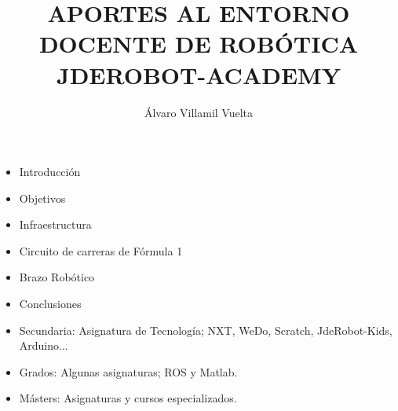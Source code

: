 \documentclass[notes,slidesec,a4]{seminar}
\title{APORTES AL ENTORNO DOCENTE DE
ROBÓTICA JDEROBOT-ACADEMY}
\author{Álvaro Villamil Vuelta}
\begin{document}
\maketitle


\begin{hslide}
	\begin{itemize}
		\item Introducción 
		\item Objetivos
		\item Infraestructura
		\item Circuito de carreras de Fórmula 1
		\item Brazo Robótico
		\item Conclusiones
	\end{itemize}
\end{hslide}

\begin{hslide}
	\begin{itemize}
		\item Secundaria: Asignatura de Tecnología; NXT, WeDo, Scratch, JdeRobot-Kids, Arduino...
		\item Grados: Algunas asignaturas; ROS y Matlab.
		\item Másters: Asignaturas y cursos especializados.
	\end{itemize}
\end{hslide}
\end{document}

